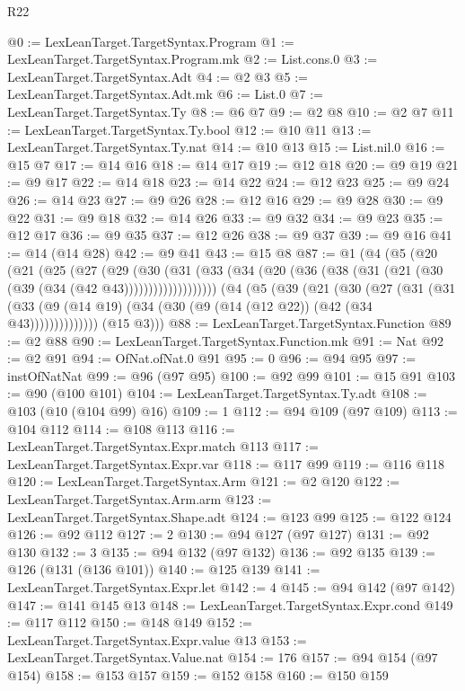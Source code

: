 \begin{lexlean}{R22}
\begin{coremodule}
@0 := LexLeanTarget.TargetSyntax.Program
@1 := LexLeanTarget.TargetSyntax.Program.mk
@2 := List.cons.{0}
@3 := LexLeanTarget.TargetSyntax.Adt
@4 := @2 @3
@5 := LexLeanTarget.TargetSyntax.Adt.mk
@6 := List.{0}
@7 := LexLeanTarget.TargetSyntax.Ty
@8 := @6 @7
@9 := @2 @8
@10 := @2 @7
@11 := LexLeanTarget.TargetSyntax.Ty.bool
@12 := @10 @11
@13 := LexLeanTarget.TargetSyntax.Ty.nat
@14 := @10 @13
@15 := List.nil.{0}
@16 := @15 @7
@17 := @14 @16
@18 := @14 @17
@19 := @12 @18
@20 := @9 @19
@21 := @9 @17
@22 := @14 @18
@23 := @14 @22
@24 := @12 @23
@25 := @9 @24
@26 := @14 @23
@27 := @9 @26
@28 := @12 @16
@29 := @9 @28
@30 := @9 @22
@31 := @9 @18
@32 := @14 @26
@33 := @9 @32
@34 := @9 @23
@35 := @12 @17
@36 := @9 @35
@37 := @12 @26
@38 := @9 @37
@39 := @9 @16
@41 := @14 (@14 @28)
@42 := @9 @41
@43 := @15 @8
@87 := @1
    (@4
      (@5
        (@20
          (@21
            (@25
              (@27
                (@29
                  (@30
                    (@31
                      (@33 (@34 (@20 (@36 (@38 (@31 (@21 (@30 (@39 (@34 (@42 @43)))))))))))))))))))
      (@4
        (@5
          (@39
            (@21
              (@30
                (@27
                  (@31
                    (@31
                      (@33 (@9 (@14 @19) (@34 (@30 (@9 (@14 (@12 @22)) (@42 (@34 @43))))))))))))))
        (@15 @3)))
@88 := LexLeanTarget.TargetSyntax.Function
@89 := @2 @88
@90 := LexLeanTarget.TargetSyntax.Function.mk
@91 := Nat
@92 := @2 @91
@94 := OfNat.ofNat.{0} @91
@95 := 0
@96 := @94 @95
@97 := instOfNatNat
@99 := @96 (@97 @95)
@100 := @92 @99
@101 := @15 @91
@103 := @90 (@100 @101)
@104 := LexLeanTarget.TargetSyntax.Ty.adt
@108 := @103 (@10 (@104 @99) @16)
@109 := 1
@112 := @94 @109 (@97 @109)
@113 := @104 @112
@114 := @108 @113
@116 := LexLeanTarget.TargetSyntax.Expr.match @113
@117 := LexLeanTarget.TargetSyntax.Expr.var
@118 := @117 @99
@119 := @116 @118
@120 := LexLeanTarget.TargetSyntax.Arm
@121 := @2 @120
@122 := LexLeanTarget.TargetSyntax.Arm.arm
@123 := LexLeanTarget.TargetSyntax.Shape.adt
@124 := @123 @99
@125 := @122 @124
@126 := @92 @112
@127 := 2
@130 := @94 @127 (@97 @127)
@131 := @92 @130
@132 := 3
@135 := @94 @132 (@97 @132)
@136 := @92 @135
@139 := @126 (@131 (@136 @101))
@140 := @125 @139
@141 := LexLeanTarget.TargetSyntax.Expr.let
@142 := 4
@145 := @94 @142 (@97 @142)
@147 := @141 @145 @13
@148 := LexLeanTarget.TargetSyntax.Expr.cond
@149 := @117 @112
@150 := @148 @149
@152 := LexLeanTarget.TargetSyntax.Expr.value @13
@153 := LexLeanTarget.TargetSyntax.Value.nat
@154 := 176
@157 := @94 @154 (@97 @154)
@158 := @153 @157
@159 := @152 @158
@160 := @150 @159

\end{coremodule}
\end{lexlean}
